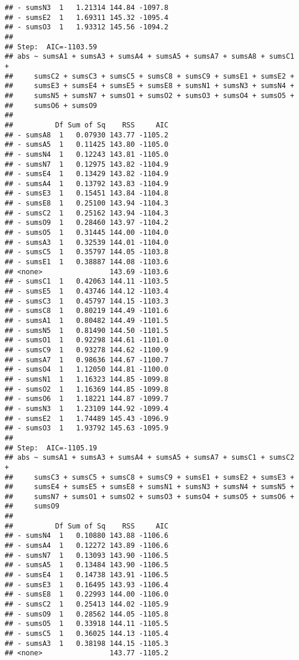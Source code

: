 \documentclass[,man,floatsintext]{apa6}
\begin{document}
\begin{verbatim}
## - sumsN3  1   1.21314 144.84 -1097.8
## - sumsE2  1   1.69311 145.32 -1095.4
## - sumsO3  1   1.93312 145.56 -1094.2
## 
## Step:  AIC=-1103.59
## abs ~ sumsA1 + sumsA3 + sumsA4 + sumsA5 + sumsA7 + sumsA8 + sumsC1 + 
##     sumsC2 + sumsC3 + sumsC5 + sumsC8 + sumsC9 + sumsE1 + sumsE2 + 
##     sumsE3 + sumsE4 + sumsE5 + sumsE8 + sumsN1 + sumsN3 + sumsN4 + 
##     sumsN5 + sumsN7 + sumsO1 + sumsO2 + sumsO3 + sumsO4 + sumsO5 + 
##     sumsO6 + sumsO9
## 
##          Df Sum of Sq    RSS     AIC
## - sumsA8  1   0.07930 143.77 -1105.2
## - sumsA5  1   0.11425 143.80 -1105.0
## - sumsN4  1   0.12243 143.81 -1105.0
## - sumsN7  1   0.12975 143.82 -1104.9
## - sumsE4  1   0.13429 143.82 -1104.9
## - sumsA4  1   0.13792 143.83 -1104.9
## - sumsE3  1   0.15451 143.84 -1104.8
## - sumsE8  1   0.25100 143.94 -1104.3
## - sumsC2  1   0.25162 143.94 -1104.3
## - sumsO9  1   0.28460 143.97 -1104.2
## - sumsO5  1   0.31445 144.00 -1104.0
## - sumsA3  1   0.32539 144.01 -1104.0
## - sumsC5  1   0.35797 144.05 -1103.8
## - sumsE1  1   0.38887 144.08 -1103.6
## <none>                143.69 -1103.6
## - sumsC1  1   0.42063 144.11 -1103.5
## - sumsE5  1   0.43746 144.12 -1103.4
## - sumsC3  1   0.45797 144.15 -1103.3
## - sumsC8  1   0.80219 144.49 -1101.6
## - sumsA1  1   0.80482 144.49 -1101.5
## - sumsN5  1   0.81490 144.50 -1101.5
## - sumsO1  1   0.92298 144.61 -1101.0
## - sumsC9  1   0.93278 144.62 -1100.9
## - sumsA7  1   0.98636 144.67 -1100.7
## - sumsO4  1   1.12050 144.81 -1100.0
## - sumsN1  1   1.16323 144.85 -1099.8
## - sumsO2  1   1.16369 144.85 -1099.8
## - sumsO6  1   1.18221 144.87 -1099.7
## - sumsN3  1   1.23109 144.92 -1099.4
## - sumsE2  1   1.74489 145.43 -1096.9
## - sumsO3  1   1.93792 145.63 -1095.9
## 
## Step:  AIC=-1105.19
## abs ~ sumsA1 + sumsA3 + sumsA4 + sumsA5 + sumsA7 + sumsC1 + sumsC2 + 
##     sumsC3 + sumsC5 + sumsC8 + sumsC9 + sumsE1 + sumsE2 + sumsE3 + 
##     sumsE4 + sumsE5 + sumsE8 + sumsN1 + sumsN3 + sumsN4 + sumsN5 + 
##     sumsN7 + sumsO1 + sumsO2 + sumsO3 + sumsO4 + sumsO5 + sumsO6 + 
##     sumsO9
## 
##          Df Sum of Sq    RSS     AIC
## - sumsN4  1   0.10880 143.88 -1106.6
## - sumsA4  1   0.12272 143.89 -1106.6
## - sumsN7  1   0.13093 143.90 -1106.5
## - sumsA5  1   0.13484 143.90 -1106.5
## - sumsE4  1   0.14738 143.91 -1106.5
## - sumsE3  1   0.16495 143.93 -1106.4
## - sumsE8  1   0.22993 144.00 -1106.0
## - sumsC2  1   0.25413 144.02 -1105.9
## - sumsO9  1   0.28562 144.05 -1105.8
## - sumsO5  1   0.33918 144.11 -1105.5
## - sumsC5  1   0.36025 144.13 -1105.4
## - sumsA3  1   0.38198 144.15 -1105.3
## <none>                143.77 -1105.2

\end{verbatim}
\end{document}
